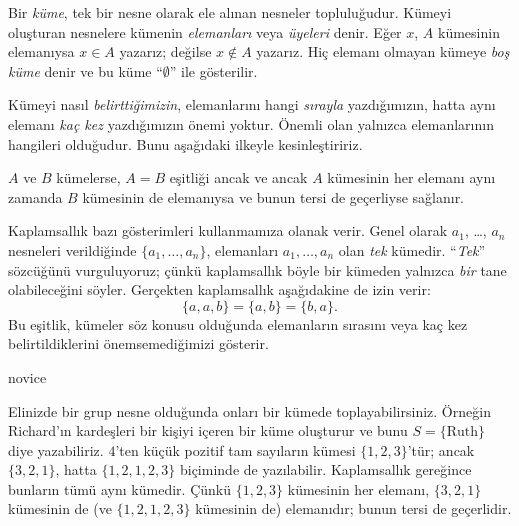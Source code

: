 


Bir \emph{küme}, tek bir nesne olarak ele alınan nesneler topluluğudur.
Kümeyi oluşturan nesnelere kümenin \emph{elemanları} veya \emph{üyeleri}
denir. Eğer $x$, $A$ kümesinin elemanıysa $x \in A$ yazarız; değilse
$x \notin A$ yazarız. Hiç elemanı olmayan kümeye \emph{boş küme} denir ve
bu küme ``$\emptyset$'' ile gösterilir.

\begin{explain}
Kümeyi nasıl \emph{belirttiğimizin}, elemanlarını hangi \emph{sırayla}
yazdığımızın, hatta aynı elemanı \emph{kaç kez} yazdığımızın önemi yoktur.
Önemli olan yalnızca elemanlarının hangileri olduğudur. Bunu aşağıdaki ilkeyle
kesinleştiririz.
\end{explain}

\begin{defn}[Kaplamsallık]
  $A$ ve $B$ kümelerse, $A = B$ eşitliği ancak ve ancak $A$ kümesinin her
  elemanı aynı zamanda $B$ kümesinin de elemanıysa ve bunun tersi de
  geçerliyse sağlanır.
\end{defn}

Kaplamsallık bazı gösterimleri kullanmamıza olanak verir. Genel olarak
$a_{1}$, \dots, $a_{n}$ nesneleri verildiğinde $\{a_{1}, \dots, a_{n}\}$,
elemanları $a_1, \ldots, a_n$ olan \emph{tek} kümedir. ``\emph{Tek}''
sözcüğünü vurguluyoruz; çünkü kaplamsallık böyle bir kümeden yalnızca
\emph{bir} tane olabileceğini söyler. Gerçekten kaplamsallık aşağıdakine de
izin verir:
  \[
    \{a, a, b\} = \{a, b\} = \{b,a\}.
  \]
Bu eşitlik, kümeler söz konusu olduğunda elemanların sırasını veya kaç kez
belirtildiklerini önemsemediğimizi gösterir.

\begin{tagblock}{novice}
\begin{ex}
Elinizde bir grup nesne olduğunda onları bir kümede toplayabilirsiniz.
Örneğin Richard'ın kardeşleri bir kişiyi içeren bir küme oluşturur ve bunu
$S=\{\textrm{Ruth}\}$ diye yazabiliriz. $4$'ten küçük pozitif tam sayıların
kümesi $\{1, 2, 3\}$'tür; ancak $\{3, 2, 1\}$, hatta $\{1, 2, 1, 2, 3\}$
biçiminde de yazılabilir. Kaplamsallık gereğince bunların tümü aynı kümedir.
Çünkü $\{1, 2, 3\}$ kümesinin her elemanı, $\{3, 2, 1\}$ kümesinin de
(ve $\{1, 2, 1, 2, 3\}$ kümesinin de) elemanıdır; bunun tersi de geçerlidir.
\end{ex}
\end{tagblock}


